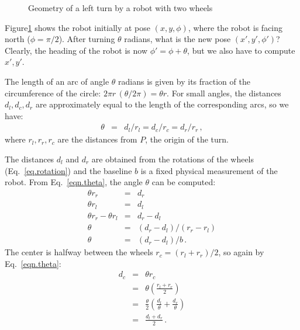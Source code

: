 \begin{figure}
\begin{center}
\end{center}
\caption{Geometry of a left turn by a robot with two wheels}\label{fig.small-turn}
\end{figure}

Figure\ref{fig.small-turn} shows the robot initially at pose $(x,y,\phi)$, where the robot is facing north ($\phi=\pi/2$). After turning $\theta$ radians, what is the new pose $(x',y',\phi')$? Clearly, the heading of the robot is now $\phi'=\phi+\theta$, but we also have to compute $x',y'$.

The length of an arc of angle $\theta$ radians is given by its fraction of the circumference of the circle: $2\pi r\,(\theta/2\pi)=\theta r$. For small angles, the distances $d_l,d_c,d_r$ are approximately equal to the length of the corresponding arcs, so we have:
\begin{eqnarray}
\theta &=& d_l/r_l = d_c/r_c = d_r/r_r\,,\label{eqn.theta}
\end{eqnarray}
where $r_l, r_r, r_c$ are the distances from $P$, the origin of the turn.

The distances $d_l$ and $d_r$ are obtained from the rotations of the wheels (Eq.~\ref{eq.rotation}) and the baseline $b$ is a fixed physical measurement of the robot. From Eq.~\ref{eqn.theta}, the angle $\theta$ can be computed:
\begin{eqnarray*}
\theta r_r &=& d_r\\
\theta r_l &=& d_l\\
\theta r_r - \theta r_l &=& d_r - d_l\\
\theta &=& (d_r - d_l) / (r_r - r_l)\\
\theta &=& (d_r - d_l) / b\,.
\end{eqnarray*}
The center is halfway between the wheels $r_c =(r_l+r_r)/2$,
so again by Eq.~\ref{eqn.theta}:
\begin{eqnarray*}
d_c&=&\theta r_c\\
&=&\theta \left(\frac{r_l+r_r}{2}\right)\\
&=&\frac{\theta}{2} \left(\frac{d_l}{\theta} + \frac{d_r}{\theta}\right)\\
&=&\frac{d_l+d_r}{2}\,.
\end{eqnarray*}

